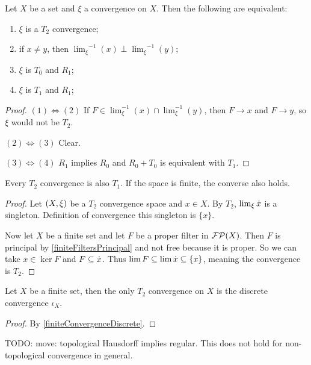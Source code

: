 \begin{proposition}
Let $X$ be a set and $\xi$ a convergence on $X$. Then the following are equivalent:
\begin{enumerate}
\item $\xi$ is a $T_2$ convergence;
\item if $x \neq y$, then ${\lim_\xi}^{-1}(x)\perp {\lim_\xi}^{-1}(y)$;
\item $\xi$ is $T_0$ and $R_1$;
\item $\xi$ is $T_1$ and $R_1$;
\end{enumerate}
\end{proposition}
\begin{proof}
$(1) \Leftrightarrow (2)$ If $F \in \lim_\xi^{-1}(x)\cap \lim_\xi^{-1}(y)$, then $F \to x$ and $F\to y$, so $\xi$ would not be $T_2$.

$(2) \Leftrightarrow (3)$ Clear.

$(3) \Leftrightarrow (4)$ $R_1$ implies $R_0$ and $R_0+T_0$ is equivalent with $T_1$.
\end{proof}

\begin{proposition}
Every $T_2$ convergence is also $T_1$. If the space is finite, the converse also holds.
\end{proposition}
\begin{proof}
Let $\left( X, \xi \right)$ be a $T_2$ convergence space and $x\in X$. By $T_2$, $\lim_\xi\dot{x}$ is a singleton. Definition of convergence this singleton is $\{x\}$.

Now let $X$ be a finite set and let $F$ be a proper filter in $\operatorname{\mathcal{FP}}(X)$. Then $F$ is principal by \ref{finiteFiltersPrincipal} and not free because it is proper. So we can take $x\in \ker F$ and $F \subseteq \dot{x}$. Thus $\lim F \subseteq \lim \dot{x} \subseteq \{x\}$, meaning the convergence is $T_2$.
\end{proof}
\begin{corollary}
Let $X$ be a finite set, then the only $T_2$ convergence on $X$ is the discrete convergence $\iota_X$.
\end{corollary}
\begin{proof}
By \ref{finiteConvergenceDiscrete}.
\end{proof}

\begin{proposition}
TODO: move: topological Hausdorff implies regular. This does not hold for non-topological convergence in general.
\end{proposition}

